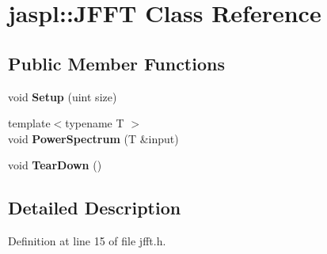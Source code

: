 \hypertarget{classjaspl_1_1_j_f_f_t}{}\section{jaspl\+:\+:J\+F\+FT Class Reference}
\label{classjaspl_1_1_j_f_f_t}
\subsection*{Public Member Functions}
\begin{DoxyCompactItemize}
\item 
void {\bfseries Setup} (uint size)\hypertarget{classjaspl_1_1_j_f_f_t_a9ae772905c4f41a2de1c8b62683f6b5e}{}\label{classjaspl_1_1_j_f_f_t_a9ae772905c4f41a2de1c8b62683f6b5e}

\item 
{\footnotesize template$<$typename T $>$ }\\void {\bfseries Power\+Spectrum} (T \&input)\hypertarget{classjaspl_1_1_j_f_f_t_a3953d73759cf17cb93f2b1e76691a8fe}{}\label{classjaspl_1_1_j_f_f_t_a3953d73759cf17cb93f2b1e76691a8fe}

\item 
void {\bfseries Tear\+Down} ()\hypertarget{classjaspl_1_1_j_f_f_t_a7ba090708a0e3b6e1dba81574fa52548}{}\label{classjaspl_1_1_j_f_f_t_a7ba090708a0e3b6e1dba81574fa52548}

\end{DoxyCompactItemize}


\subsection{Detailed Description}


Definition at line 15 of file jfft.\+h.

